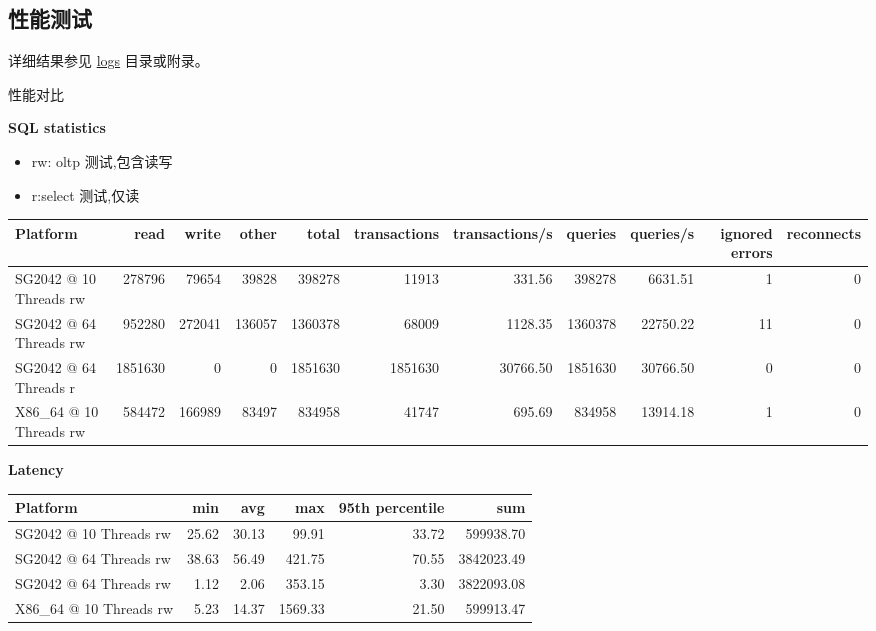 \documentclass{article}
\begin{document}
\subsection{性能测试}

详细结果参见 \href{https://github.com/QA-Team-lo/dbtest/tree/main/opengauss/logs}{logs} 目录或附录。

性能对比

\textbf{SQL statistics}

\begin{itemize}
    \item rw: oltp 测试,包含读写 
    \item r:select 测试,仅读
\end{itemize}

\begin{table}[h]
\centering
\begin{tabular}{|l|r|r|r|r|r|r|r|r|r|r|}
\hline
Platform & read & write & other & total & transactions & transactions/s & queries & queries/s & ignored errors & reconnects \\
\hline
SG2042 @ 10 Threads rw & 278796 & 79654 & 39828 & 398278 & 11913 & 331.56 & 398278 & 6631.51 & 1 & 0 \\
SG2042 @ 64 Threads rw & 952280 & 272041 & 136057 & 1360378 & 68009 & 1128.35 & 1360378 & 22750.22 & 11 & 0 \\
SG2042 @ 64 Threads r  & 1851630 & 0      & 0      & 1851630 & 1851630 & 30766.50 & 1851630 & 30766.50 & 0 & 0 \\
X86\_64 @ 10 Threads rw & 584472 & 166989 & 83497 & 834958 & 41747 & 695.69 & 834958 & 13914.18 & 1 & 0 \\
\hline
\end{tabular}
\end{table}

\textbf{Latency}

\begin{table}[h]
\centering
\begin{tabular}{|l|r|r|r|r|r|}
\hline
Platform & min & avg & max & 95th percentile & sum \\
\hline
SG2042 @ 10 Threads rw & 25.62 & 30.13 & 99.91 & 33.72 & 599938.70 \\
SG2042 @ 64 Threads rw & 38.63 & 56.49 & 421.75 & 70.55 & 3842023.49 \\
SG2042 @ 64 Threads rw & 1.12 & 2.06 & 353.15 & 3.30 & 3822093.08 \\
X86\_64 @ 10 Threads rw & 5.23 & 14.37 & 1569.33 & 21.50 & 599913.47 \\
\hline
\end{tabular}
\end{table}
\end{document}
